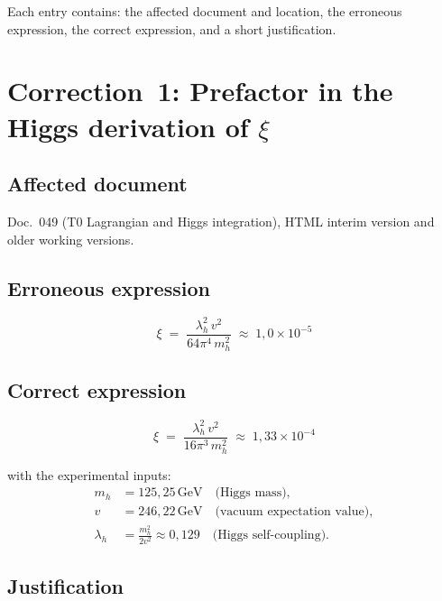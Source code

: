 Each entry contains: the affected document and location, the erroneous
expression, the correct expression, and a short justification.

\section{\texorpdfstring{Correction~1: Prefactor in the Higgs derivation of $\xi$}{Correction 1: Prefactor in the Higgs derivation of xi}}

\subsection*{Affected document}

Doc.~049 (T0 Lagrangian and Higgs integration), HTML interim version
and older working versions.

\subsection*{Erroneous expression}

\begin{equation}
  \xi \;=\; \frac{\lambda_h^2\, v^2}{64\pi^4\, m_h^2}
  \;\approx\; 1{,}0 \times 10^{-5}
  \tag{old -- wrong}
\end{equation}

\subsection*{Correct expression}

\begin{equation}
  \boxed{
    \xi \;=\; \frac{\lambda_h^2\, v^2}{16\pi^3\, m_h^2}
    \;\approx\; 1{,}33 \times 10^{-4}
  }
  \tag{190.1}
\end{equation}

with the experimental inputs:
\begin{align*}
  m_h      &= 125{,}25\,\text{GeV} \quad \text{(Higgs mass)}, \\
  v        &= 246{,}22\,\text{GeV} \quad \text{(vacuum expectation value)}, \\
  \lambda_h &= \frac{m_h^2}{2v^2} \approx 0{,}129
               \quad \text{(Higgs self-coupling)}.
\end{align*}

\subsection*{Justification}


